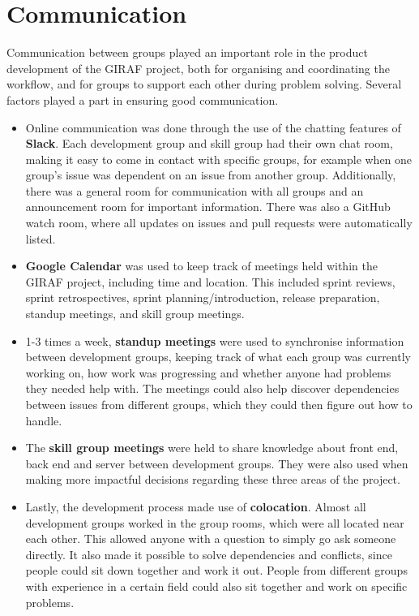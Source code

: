 \section{Communication}
\label{sect:communication}
Communication between groups played an important role in the product development of the GIRAF project, both for organising and coordinating the workflow, and for groups to support each other during problem solving. Several factors played a part in ensuring good communication.

\begin{itemize}
\item Online communication was done through the use of the chatting features of \textbf{Slack}. Each development group and skill group had their own chat room, making it easy to come in contact with specific groups, for example when one group's issue was dependent on an issue from another group.
Additionally, there was a general room for communication with all groups and an announcement room for important information.
There was also a GitHub watch room, where all updates on issues and pull requests were automatically listed.

\item \textbf{Google Calendar} was used to keep track of meetings held within the GIRAF project, including time and location. This included sprint reviews, sprint retrospectives, sprint planning/introduction, release preparation, standup meetings, and skill group meetings. 

\item 1-3 times a week, \textbf{standup meetings} were used to synchronise information between development groups, keeping track of what each group was currently working on, how work was progressing and whether anyone had problems they needed help with. The meetings could also help discover dependencies between issues from different groups, which they could then figure out how to handle.

\item The \textbf{skill group meetings} were held to share knowledge about front end, back end and server between development groups. They were also used when making more impactful decisions regarding these three areas of the project. 

\item Lastly, the development process made use of \textbf{colocation}. Almost all development groups worked in the group rooms, which were all located near each other. This allowed anyone with a question to simply go ask someone directly. It also made it possible to solve dependencies and conflicts, since people could sit down together and work it out. People from different groups with experience in a certain field could also sit together and work on specific problems. 
\end{itemize}